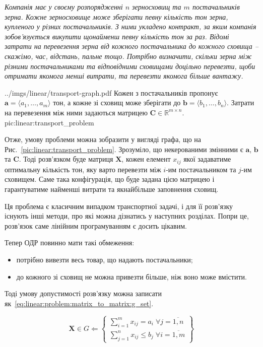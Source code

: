 \documentclass[\main/book.tex]{subfiles}
\begin{document}
\textit{Компанія має у своєму розпорядженні $n$ зерносховищ та $m$ постачальників зерна. Кожне зерносховище може зберігати певну кількість тон зерна, купленого у різних постачальників. З ними укладено контракт, за яким компанія зобов'язується викупити щонайменш певну кількість тон за раз. Відомі затрати на перевезення зерна від кожного постачальника до кожного сховища -- скажімо, час, відстань, пальне тощо. Потрібно визначити, скільки зерна між різними постачальниками та відповідними сховищами доцільно перевезти, щоби отримати якомога менші витрати, та перевезти якомога більше вантажу.}

\illustration
 {../imgs/linear/transport-graph.pdf}
 {Кожен з постачальників пропонує $\mathbf{a} = {\langle a_1, \ldots, a_m \rangle}$ тон, а кожне зі сховищ може зберігати до $\mathbf{b} = {\langle b_1, \ldots, b_n \rangle}$. Затрати на перевезення між ними задаються матрицею $\mathbf{C} \in \mathbb{R}^{m \times n}$.}
 {pic:linear:transport_problem}

Отже, умову проблеми можна зобразити у вигляді графа, що на Рис.~\ref{pic:linear:transport_problem}. Зрозуміло, що некерованими змінними є $\mathbf{a}$, $\mathbf{b}$ та $\mathbf{C}$. Тоді розв'язком буде матриця $\mathbf{X}$, кожен елемент $x_{ij}$ якої задаватиме \flqq{}оптимальну\frqq{} кількість тон, яку варто перевезти між $i$-им постачальником та $j$-им сховищем. Саме така конфігурація, що буде задана цією матрицею і гарантуватиме найменші витрати та якнайбільше заповнення сховищ.

\begin{note}
 Ця проблема є класичним випадком транспортної задачі, і для її розв'язку існують інші методи, про які можна дізнатись у наступних розділах. Попри це, розв'язок саме лінійним програмуванням є досить цікавим.
\end{note}

Тепер ОДР повинно мати такі обмеження:

\begin{itemize}
 \item потрібно вивезти весь товар, що надають постачальники;
 \item до кожного зі сховищ не можна привезти більше, ніж воно може вмістити.
\end{itemize}

Тоді умову допустимості розв'язку можна записати як~\ref{eq:linear:problem:matrix_to_matrix:g_set}.

\begin{equation}
 \mathbf{X} \in G \Leftarrow \left\{
 \begin{array}{l}
  \displaystyle
  \sum_{i=1}^m x_{ij} = a_i\; \forall j = \overline{1, n} \\
  \displaystyle
  \sum_{j=1}^n x_{ij} \leq b_j\; \forall i = \overline{1, m}
 \end{array}
 \right\}
 \label{eq:linear:problem:matrix_to_matrix:g_set}
\end{equation}
\end{document}
